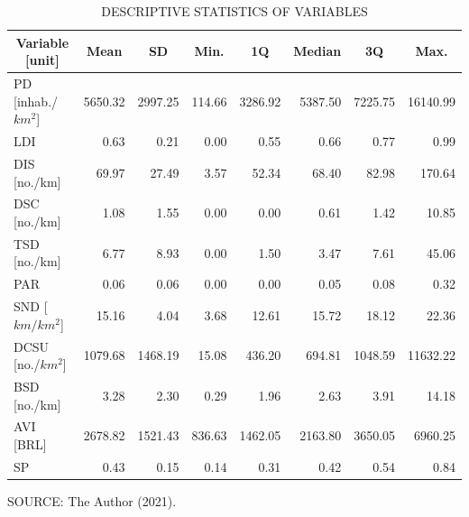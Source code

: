 \begin{table}[!htbp]
    \footnotesize
    \captionsetup{justification=raggedright,
        singlelinecheck=false,
        font=footnotesize}
    \caption{DESCRIPTIVE STATISTICS OF VARIABLES}
    \centering
    \begin{tabular}{lrrrrrrr}
        \hline
        \multicolumn{1}{c}{\textbf{Variable [unit]}} & \multicolumn{1}{c}{\textbf{Mean}} & \multicolumn{1}{c}{\textbf{SD}} & \multicolumn{1}{c}{\textbf{Min.}} & \multicolumn{1}{c}{\textbf{1Q}} & \multicolumn{1}{c}{\textbf{Median}} & \multicolumn{1}{c}{\textbf{3Q}} & \multicolumn{1}{c}{\textbf{Max.}} \\ 
        \hline
        PD [inhab./$km^2$] & 5650.32 & 2997.25 & 114.66 & 3286.92 & 5387.50 & 7225.75 & 16140.99 \\ 
        LDI & 0.63 & 0.21 & 0.00 & 0.55 & 0.66 & 0.77 & 0.99 \\
        DIS [no./km] & 69.97 & 27.49 & 3.57 & 52.34 & 68.40 & 82.98 & 170.64 \\
        DSC [no./km] & 1.08 & 1.55 & 0.00 & 0.00 & 0.61 & 1.42 & 10.85 \\ 
        TSD [no./km] & 6.77 & 8.93 & 0.00 & 1.50 & 3.47 & 7.61 & 45.06 \\
        PAR & 0.06 & 0.06 & 0.00 & 0.00 & 0.05 & 0.08 & 0.32 \\ 
        SND [$km/km^2$] & 15.16 & 4.04 & 3.68 & 12.61 & 15.72 & 18.12 & 22.36 \\
        DCSU [no./$km^2$] & 1079.68 & 1468.19 & 15.08 & 436.20 & 694.81 & 1048.59 & 11632.22 \\
        BSD [no./km] & 3.28 & 2.30 & 0.29 & 1.96 & 2.63 & 3.91 & 14.18 \\
        AVI [BRL] & 2678.82 & 1521.43 & 836.63 & 1462.05 & 2163.80 & 3650.05 & 6960.25 \\
        SP & 0.43 & 0.15 & 0.14 & 0.31 & 0.42 & 0.54 & 0.84 \\
        \hline
    \end{tabular}
    \label{tab:var_summary}
    \par \vspace{2mm} \footnotesize \raggedright
    SOURCE: The Author (2021).
\end{table}


